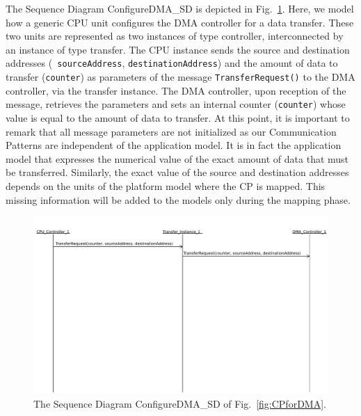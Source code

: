 \documentclass{llncs}
\begin{document}
The Sequence Diagram ConfigureDMA\_SD is depicted in
Fig.~\ref{fig:ConfigureDMA_SD}. Here, we model how a generic CPU unit configures the DMA controller for a data transfer. These two units are represented as two instances of type controller,
interconnected by an instance of type transfer. The CPU instance sends the source and destination addresses ({\tt
sourceAddress}, {\tt destinationAddress}) and the amount of data to transfer ({\tt counter}) as parameters of the
message {\tt TransferRequest()} to the DMA controller, via the transfer instance. The DMA controller, upon reception of
the message, retrieves the parameters and sets an internal counter ({\tt counter}) whose value is equal to the amount of
data to transfer. At this point, it is important to remark that all message parameters are not initialized as our
Communication Patterns are independent of the application model. It is in fact the application model that expresses
the numerical value of the exact amount of data that must be transferred. Similarly, the exact value of the source and
destination addresses depends on the units of the platform model where the CP is mapped. This missing information will
be added to the models only during the mapping phase.
%
\begin{figure}[!htbp]
	\centering
	\includegraphics[trim= 0cm 12cm 0cm
0cm, clip, width=\textwidth]{figures/ConfigureDMA_SD.pdf}
	\caption{The Sequence Diagram ConfigureDMA\_SD of Fig.~\ref{fig:CPforDMA}.}
	\label{fig:ConfigureDMA_SD}
\end{figure}
%
\end{document}
